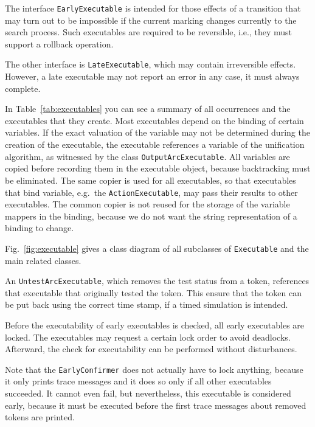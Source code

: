 The interface
\texttt{EarlyExecutable} is intended for those effects of a transition
that may turn out to be impossible if the current
marking changes currently to the search process. Such
executables are required to be reversible, i.e., they must support
a rollback operation.

The other interface is \texttt{LateExecutable}, which may contain
irreversible effects. However, a late executable may not report an
error in any case, it must always complete.

In Table~\ref{tab:executables} you can see a summary of
all occurrences and the executables that they create.
Most executables depend on the binding of certain variables.
If the exact valuation of the variable may not be determined during the
creation of the executable, the executable references a variable
of the unification algorithm, as witnessed by the class
\texttt{OutputArcExecutable}. All variables are copied before
recording them in the executable object, because backtracking must be
eliminated. The same copier is used for all executables, so that
executables that bind variable, e.g.~the \texttt{ActionExecutable},
may pass their results to other executables. 
The common copier is not reused for the storage of the
variable mappers in the binding, because we do not want the
string representation of a binding to change.


Fig.~\ref{fig:executable} gives a class diagram of
all subclasses of \texttt{Executable} and the main related classes.

An \texttt{UntestArcExecutable}, which removes the test status from a token,
references that executable that originally tested the token.
This ensure that the token can be put back using the correct
time stamp, if a timed simulation is intended.

Before the executability of early executables is checked, all
early executables are locked. The executables may request
a certain lock order to avoid deadlocks. Afterward, the
check for executability can be performed without disturbances.

Note that the \texttt{EarlyConfirmer} does not actually have to lock
anything, because it only prints trace messages and it does so
only if all other executables succeeded. It cannot even fail, but
nevertheless, this executable is considered early, because it
must be executed before the first trace messages about removed tokens are
printed.

